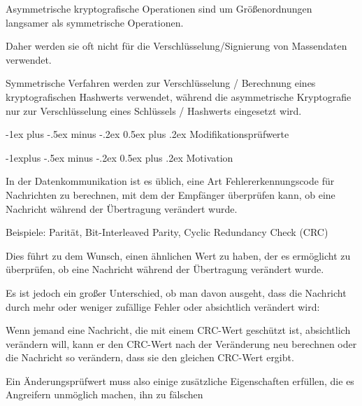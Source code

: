 \documentclass[a4paper]{article}
\makeatletter
\renewcommand{\section}{\@startsection{section}{1}{0mm}%
 {-1ex plus -.5ex minus -.2ex}%
 {0.5ex plus .2ex}%
 {\normalfont\large\bfseries}}
\renewcommand{\subsection}{\@startsection{subsection}{2}{0mm}%
 {-1explus -.5ex minus -.2ex}%
 {0.5ex plus .2ex}%
 {\normalfont\normalsize\bfseries}}
\makeatother
\begin{document}
\begin{multicols}{3}
\begin{itemize*}
            \begin{itemize*}
                  \item Asymmetrische kryptografische Operationen sind um Größenordnungen langsamer als symmetrische Operationen.
                  \item Daher werden sie oft nicht für die Verschlüsselung/Signierung von Massendaten verwendet.
                  \item Symmetrische Verfahren werden zur Verschlüsselung / Berechnung eines kryptografischen Hashwerts verwendet, während die asymmetrische Kryptografie nur zur Verschlüsselung eines Schlüssels / Hashwerts eingesetzt wird.
            \end{itemize*}
      \end{itemize*}


      \section{Modifikationsprüfwerte}


      \subsection{Motivation}

      \begin{itemize*}
            \item
            In der Datenkommunikation ist es üblich, eine Art Fehlererkennungscode
            für Nachrichten zu berechnen, mit dem der Empfänger überprüfen kann,
            ob eine Nachricht während der Übertragung verändert wurde.

            \begin{itemize*}
                  \item Beispiele: Parität, Bit-Interleaved Parity, Cyclic Redundancy Check (CRC)
            \end{itemize*}
            \item
            Dies führt zu dem Wunsch, einen ähnlichen Wert zu haben, der es
            ermöglicht zu überprüfen, ob eine Nachricht während der Übertragung
            verändert wurde.
            \item
            Es ist jedoch ein großer Unterschied, ob man davon ausgeht, dass die
            Nachricht durch mehr oder weniger zufällige Fehler oder absichtlich
            verändert wird:

            \begin{itemize*}
                  \item Wenn jemand eine Nachricht, die mit einem CRC-Wert geschützt ist, absichtlich verändern will, kann er den CRC-Wert nach der Veränderung neu berechnen oder die Nachricht so verändern, dass sie den gleichen CRC-Wert ergibt.
            \end{itemize*}
            \item
            Ein Änderungsprüfwert muss also einige zusätzliche Eigenschaften
            erfüllen, die es Angreifern unmöglich machen, ihn zu fälschen


\end{itemize*}
\end{multicols}
\end{document}
